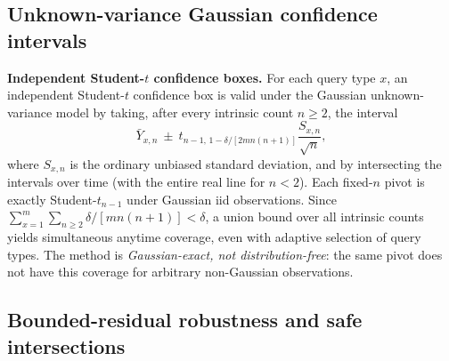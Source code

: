 \documentclass{article}
\theoremstyle{plain}
\theoremstyle{definition}
\begin{document}
\subsection{Unknown-variance Gaussian confidence intervals}
\label{app:student-t-boxes}

\noindent\textbf{Independent Student-$t$ confidence boxes.}
For each query type $x$, an independent Student-$t$ confidence box is
valid under the Gaussian unknown-variance model by taking, after every
intrinsic count $n\ge2$, the interval
\begin{equation}
 \bar Y_{x,n}\ \pm\
 t_{n-1,\,1-\delta/[2mn(n+1)]}
 \frac{S_{x,n}}{\sqrt n},
 \label{eq:v34-student-t-box}
\end{equation}
where $S_{x,n}$ is the ordinary unbiased standard deviation, and by
intersecting the intervals over time (with the entire real line for
$n<2$). Each fixed-$n$ pivot is exactly Student-$t_{n-1}$ under
Gaussian iid observations. Since
$\sum_{x=1}^{m}\sum_{n\ge2}\delta/[mn(n+1)]<\delta$,
a union bound over all intrinsic counts yields simultaneous anytime
coverage, even with adaptive selection of query types. The method is
\emph{Gaussian-exact, not distribution-free}: the same pivot does not
have this coverage for arbitrary non-Gaussian observations.

\subsection{Bounded-residual robustness and safe intersections}
\label{app:bounded-residuals}
\end{document}
